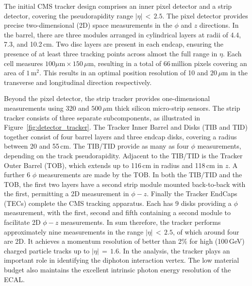 The initial CMS tracker design comprises an inner pixel detector and a strip detector, covering the pseudorapidity range $|\eta|\,<\,2.5$.
The pixel detector provides precise two-dimensional (2D) space measurements in the $\phi$ and $z$ directions.
In the barrel, there are three modules arranged in cylindrical layers at radii of 4.4, 7.3, and 10.2\,cm. 
Two disc layers are present in each endcap, ensuring the presence of at least three tracking points across almost the full range in $\eta$.
Each cell measures $100\mu\textrm{m}\times150\,\mu\textrm{m}$, resulting in a total of 66\,million pixels covering an area of $1\,\textrm{m}^2$.
This results in an optimal position resolution of 10 and $20\,\mu\textrm{m}$ in the transverse and longitudinal direction respectively.

Beyond the pixel detector, the strip tracker provides one-dimensional measurements using 320 and $500\,\mu\textrm{m}$ thick silicon micro-strip sensors.
The strip tracker consists of three separate subcomponents, as illustrated in Figure~\ref{fig:detector_tracker}.
The Tracker Inner Barrel and Disks (TIB and TID) together consist of four barrel layers and three endcap disks, covering a radius between 20 and 55\,cm. %
The TIB/TID provide as many as four $\phi$ measurements, depending on the track pseudorapidity.
Adjacent to the TIB/TID is the Tracker Outer Barrel (TOB), which extends up to 116\,cm in radius and 118\,cm in $z$.
A further 6 $\phi$ measurements are made by the TOB.
In both the TIB/TID and the TOB, the first two layers have a second strip module mounted back-to-back with the first, permitting a 2D measurement in $\phi-z$.
Finally the Tracker EndCaps (TECs) complete the CMS tracking apparatus.
Each has 9 disks providing a $\phi$ measurement, with the first, second and fifth containing a second module to facilitate 2D $\phi-z$ measurements.
In sum therefore, the tracker performs approximately nine measurements in the range $|\eta|\,<\,2.5$, of which around four are 2D.
It achieves a momentum resolution of better than 2\% for high \pt (100\,GeV) charged particle tracks up to $|\eta|\,=\,1.6$. %
In the \Hgg analysis, the tracker plays an important role in identifying the diphoton interaction vertex. %
The low material budget also maintains the excellent intrinsic photon energy resolution of the ECAL.

